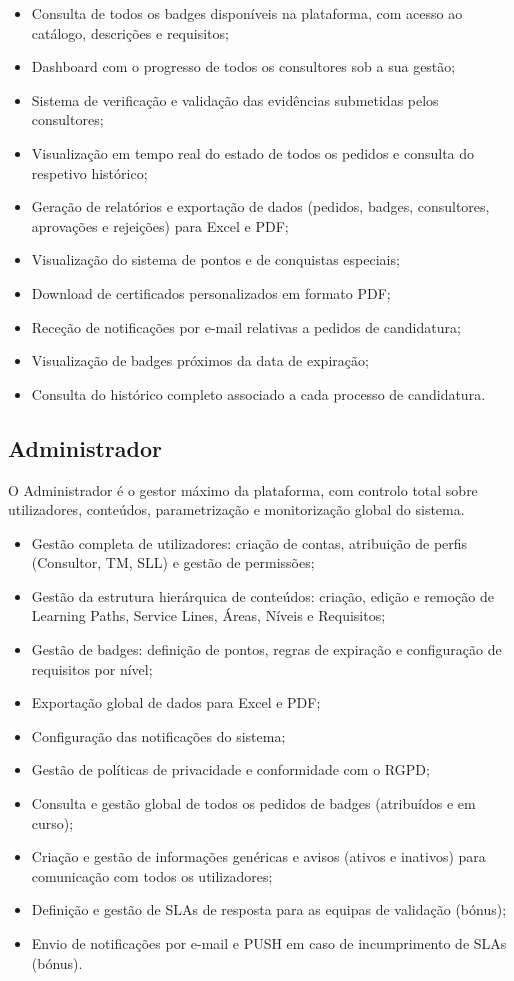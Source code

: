 \documentclass[12pt,a4paper]{report}
\begin{document}
\begin{itemize}
  \item Consulta de todos os badges disponíveis na plataforma, com acesso ao catálogo, descrições e requisitos;
  \item Dashboard com o progresso de todos os consultores sob a sua gestão;
  \item Sistema de verificação e validação das evidências submetidas pelos consultores;
  \item Visualização em tempo real do estado de todos os pedidos e consulta do respetivo histórico;
  \item Geração de relatórios e exportação de dados (pedidos, badges, consultores, aprovações e rejeições) para Excel e PDF;
  \item Visualização do sistema de pontos e de conquistas especiais;
  \item Download de certificados personalizados em formato PDF;
  \item Receção de notificações por e-mail relativas a pedidos de candidatura;
  \item Visualização de badges próximos da data de expiração;
  \item Consulta do histórico completo associado a cada processo de candidatura.
\end{itemize}

\subsection{Administrador}

O Administrador é o gestor máximo da plataforma, com controlo total sobre utilizadores, conteúdos, parametrização e monitorização global do sistema.

\begin{itemize}
  \item Gestão completa de utilizadores: criação de contas, atribuição de perfis (Consultor, TM, SLL) e gestão de permissões;
  \item Gestão da estrutura hierárquica de conteúdos: criação, edição e remoção de Learning Paths, Service Lines, Áreas, Níveis e Requisitos;
  \item Gestão de badges: definição de pontos, regras de expiração e configuração de requisitos por nível;
  \item Exportação global de dados para Excel e PDF;
  \item Configuração das notificações do sistema;
  \item Gestão de políticas de privacidade e conformidade com o RGPD;
  \item Consulta e gestão global de todos os pedidos de badges (atribuídos e em curso);
  \item Criação e gestão de informações genéricas e avisos (ativos e inativos) para comunicação com todos os utilizadores;
  \item Definição e gestão de SLAs de resposta para as equipas de validação (bónus);
  \item Envio de notificações por e-mail e PUSH em caso de incumprimento de SLAs (bónus).
\end{itemize}
\end{document}
